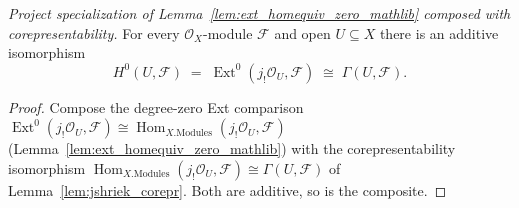 \begin{lemma}

  \label{lem:absolute_cohomology_zero}
  \textit{Project specialization of Lemma~\ref{lem:ext_homequiv_zero_mathlib} composed with
  corepresentability.}
  For every \(\mathcal{O}_X\)-module \(\mathcal{F}\) and open \(U \subseteq X\) there is an additive
  isomorphism
  \[
    H^0(U, \mathcal{F}) \;=\; \operatorname{Ext}^0(j_!\mathcal{O}_U, \mathcal{F})
      \;\cong\; \Gamma(U, \mathcal{F}).
  \]
\end{lemma}
\begin{proof}
  \leanok
  Compose the degree-zero Ext comparison
  \(\operatorname{Ext}^0(j_!\mathcal{O}_U, \mathcal{F}) \cong
  \operatorname{Hom}_{X.\mathrm{Modules}}(j_!\mathcal{O}_U, \mathcal{F})\)
  (Lemma~\ref{lem:ext_homequiv_zero_mathlib}) with the corepresentability isomorphism
  \(\operatorname{Hom}_{X.\mathrm{Modules}}(j_!\mathcal{O}_U, \mathcal{F}) \cong \Gamma(U,
  \mathcal{F})\) of Lemma~\ref{lem:jshriek_corepr}. Both are additive, so is the composite.
\end{proof}

